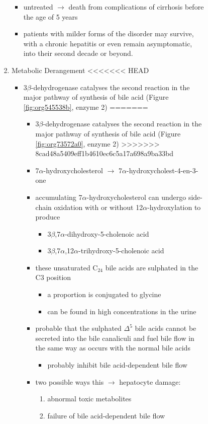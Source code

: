 \documentclass{scrartcl}
\begin{document}
\begin{itemize}
\begin{enumerate}
\begin{enumerate}
\begin{enumerate}
\begin{enumerate}
\begin{itemize}
\item untreated \(\to\) death from complications of cirrhosis before the age
of 5 years
\item patients with milder forms of the disorder may survive, with a
chronic hepatitis or even remain asymptomatic, into their second
decade or beyond.
\end{itemize}
\item Metabolic Derangement
<<<<<<< HEAD
\label{sec:org9edf9c3}
\begin{itemize}
\item 3\(\beta\)-dehydrogenase catalyses the second reaction in the major
pathway of synthesis of bile acid (Figure \ref{fig:org545538b}, enzyme 2)
=======
\label{sec:org1fa1113}
\begin{itemize}
\item 3\(\beta\)-dehydrogenase catalyses the second reaction in the major
pathway of synthesis of bile acid (Figure \ref{fig:org73572a0}, enzyme 2)
>>>>>>> 8cad48a5409eff1b4610ec6c5a17a698a9ba33bd
\item 7\(\alpha\)-hydroxycholesterol \(\to\) 7\(\alpha\)-hydroxycholest-4-en-3-one
\item accumulating 7\(\alpha\)-hydroxycholesterol can undergo side-chain
oxidation with or without 12\(\alpha\)-hydroxylation to produce
\begin{itemize}
\item 3\(\beta\),7\(\alpha\)-dihydroxy-5-cholenoic acid
\item 3\(\beta\),7\(\alpha\),12\(\alpha\)-trihydroxy-5-cholenoic acid
\end{itemize}
\item these unsaturated C\(_{\text{24}}\) bile acids are sulphated in the C3 position
\begin{itemize}
\item a proportion is conjugated to glycine
\item can be found in high concentrations in the urine
\end{itemize}
\item probable that the sulphated \(\Delta^{\text{5}}\) bile acids cannot be secreted
into the bile canaliculi and fuel bile flow in the same way as
occurs with the normal bile acids
\begin{itemize}
\item probably inhibit bile acid-dependent bile flow
\end{itemize}
\item two possible ways this \(\to\) hepatocyte damage:
\begin{enumerate}
\item abnormal toxic metabolites
\item failure of bile acid-dependent bile flow
\end{enumerate}
\end{itemize}


\end{itemize}
\end{enumerate}
\end{enumerate}
\end{enumerate}
\end{enumerate}
\end{itemize}
\end{document}
